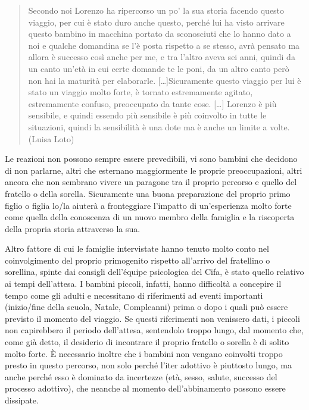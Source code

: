 \documentclass[12pt,oneside,svgnames]{memoir}
\newenvironment{quotationb}%
{\color{maincolor}\begin{leftbar}\begin{quotation}}%
{\end{quotation}\end{leftbar}\ignorespacesafterend}
\begin{document}
\begin{quotationb}
Secondo noi Lorenzo ha ripercorso un po' la sua storia facendo questo
viaggio, per cui è stato duro anche questo, perché lui ha visto arrivare
questo bambino in macchina portato da sconosciuti che lo hanno dato a
noi e qualche domandina se l'è posta rispetto a se stesso, avrà pensato
ma allora è successo così anche per me, e tra l'altro aveva sei anni,
quindi da un canto un'età in cui certe domande te le poni, da un altro
canto però non hai la maturità per elaborarle. {[}\ldots{}{]}Sicuramente
questo viaggio per lui è stato un viaggio molto forte, è tornato
estremamente agitato, estremamente confuso, preoccupato da tante cose.
{[}\ldots{}{]} Lorenzo è più sensibile, e quindi essendo più sensibile è
più coinvolto in tutte le situazioni, quindi la sensibilità è una dote
ma è anche un limite a volte. (Luisa Loto)
\end{quotationb}

Le reazioni non possono sempre essere prevedibili, vi sono bambini che
decidono di non parlarne, altri che esternano maggiormente le proprie
preoccupazioni, altri ancora che non sembrano vivere un paragone tra il
proprio percorso e quello del fratello o della sorella. Sicuramente una
buona preparazione del proprio primo figlio o figlia lo/la aiuterà a
fronteggiare l'impatto di un'esperienza molto forte come quella della
conoscenza di un nuovo membro della famiglia e la riscoperta della
propria storia attraverso la sua.

Altro fattore di cui le famiglie intervistate hanno tenuto molto conto
nel coinvolgimento del proprio primogenito rispetto all'arrivo del
fratellino o sorellina, spinte dai consigli dell'équipe psicologica del
Cifa, è stato quello relativo ai tempi dell'attesa. I bambini piccoli,
infatti, hanno difficoltà a concepire il tempo come gli adulti e
necessitano di riferimenti ad eventi importanti (inizio/fine della
scuola, Natale, Compleanni) prima o dopo i quali può essere previsto il
momento del viaggio. Se questi riferimenti non venissero dati, i piccoli
non capirebbero il periodo dell'attesa, sentendolo troppo lungo, dal
momento che, come già detto, il desiderio di incontrare il proprio
fratello o sorella è di solito molto forte. È necessario inoltre che i
bambini non vengano coinvolti troppo presto in questo percorso, non solo
perché l'iter adottivo è piuttosto lungo, ma anche perché esso è
dominato da incertezze (età, sesso, salute, successo del processo
adottivo), che neanche al momento dell'abbinamento possono essere
dissipate.
\end{document}
